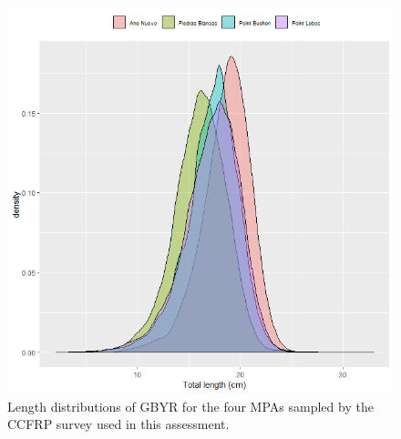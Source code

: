 \documentclass[12pt,]{article}
\begin{document}
\FloatBarrier

\begin{figure}
\centering
\includegraphics{Figures/CCFRP_lengths_by_site.png}
\caption{Length distributions of GBYR for the four MPAs sampled by the
CCFRP survey used in this assessment. \label{CCFRP_lengths_by_site}}
\end{figure}
\end{document}
